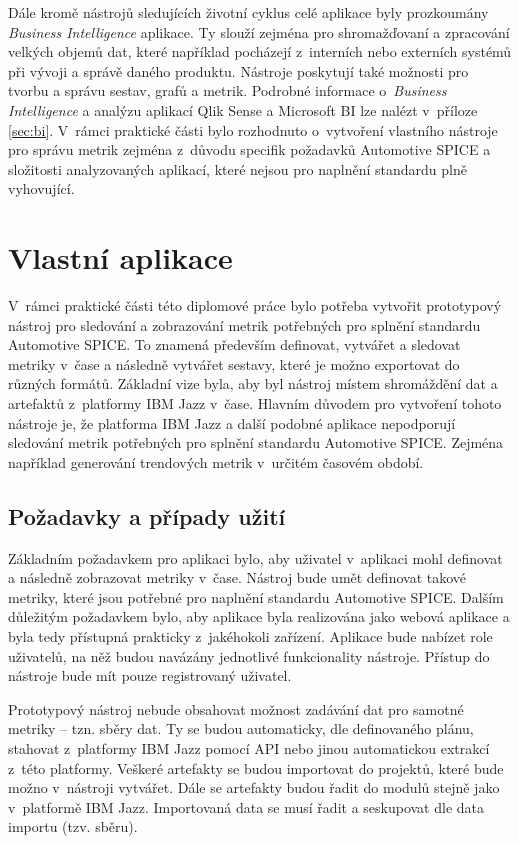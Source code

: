 \documentclass[czech,master]{diploma}
\begin{document}
Dále kromě nástrojů sledujících životní cyklus celé aplikace byly prozkoumány \textit{Business Intelligence} aplikace. Ty slouží zejména pro shromažďovaní a zpracování velkých objemů dat, které například pocházejí z~interních nebo externích systémů při vývoji a správě daného produktu. Nástroje poskytují také možnosti pro tvorbu a správu sestav, grafů a metrik. Podrobné informace o~\textit{Business Intelligence} a analýzu aplikací Qlik Sense a Microsoft BI lze nalézt v~příloze \ref{sec:bi}. V~rámci praktické části bylo rozhodnuto o~vytvoření vlastního nástroje pro správu metrik zejména z~důvodu specifik požadavků Automotive SPICE a složitosti analyzovaných aplikací, které nejsou pro naplnění standardu plně vyhovující.

\chapter{Vlastní aplikace}
\label{sec:my_app}
V~rámci  praktické části této diplomové práce bylo potřeba vytvořit  prototypový nástroj pro sledování a zobrazování metrik potřebných pro splnění standardu Automotive SPICE. To znamená především definovat, vytvářet a sledovat metriky v~čase a následně vytvářet sestavy, které je možno exportovat do různých formátů. Základní vize byla, aby byl nástroj místem shromáždění dat a artefaktů z~platformy IBM Jazz v~čase. Hlavním důvodem pro vytvoření tohoto nástroje je, že platforma IBM Jazz a další podobné aplikace nepodporují sledování metrik potřebných pro splnění standardu Automotive SPICE. Zejména například generování trendových metrik v~určitém časovém období.

\section{Požadavky a případy užití}
\label{sec:requirements}
Základním požadavkem pro aplikaci bylo, aby uživatel v~aplikaci mohl definovat a následně zobrazovat metriky v~čase. Nástroj bude umět definovat takové metriky, které jsou potřebné pro naplnění standardu Automotive SPICE. Dalším důležitým požadavkem bylo, aby aplikace byla realizována jako webová aplikace a byla tedy přístupná prakticky z~jakéhokoli zařízení. Aplikace bude nabízet role uživatelů, na něž budou navázány jednotlivé funkcionality nástroje. Přístup do nástroje bude mít pouze registrovaný uživatel.

Prototypový nástroj nebude obsahovat možnost zadávání dat pro samotné metriky -- tzn. sběry dat. Ty se budou automaticky, dle definovaného plánu, stahovat z~platformy IBM Jazz pomocí API nebo jinou automatickou extrakcí z~této platformy. Veškeré artefakty se budou importovat do projektů, které bude možno v~nástroji vytvářet. Dále se artefakty budou řadit do modulů stejně jako v~platformě IBM Jazz. Importovaná data se musí řadit a seskupovat dle data importu (tzv. sběru).
\end{document}
